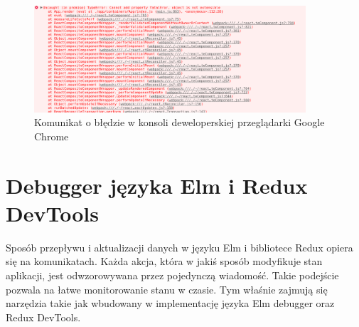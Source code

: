 \begin{figure}[h]
	\centering
	\includegraphics[width=0.9\textwidth]{images/react_error}
	\caption{Komunikat o błędzie w konsoli deweloperskiej przeglądarki Google Chrome}
	\label{fig:reactError}
\end{figure}

\section{Debugger języka Elm i Redux DevTools}
Sposób przepływu i aktualizacji danych w języku Elm i bibliotece Redux opiera się na komunikatach. Każda akcja, która w jakiś sposób modyfikuje stan aplikacji, jest odwzorowywana przez pojedynczą wiadomość. Takie podejście pozwala na łatwe monitorowanie stanu w czasie. Tym właśnie zajmują się narzędzia takie jak wbudowany w implementację języka Elm debugger oraz Redux DevTools.

